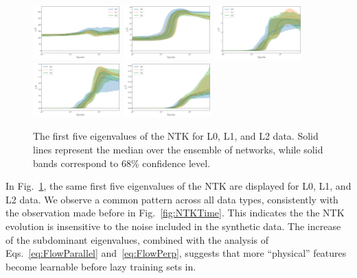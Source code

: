 \begin{figure}[t]
  \centering
  \includegraphics[width=0.30\textwidth]{figs/section_3/ntk_eigvals_L0_L1_L2_n_1.pdf}
  \includegraphics[width=0.30\textwidth]{figs/section_3/ntk_eigvals_L0_L1_L2_n_2.pdf}
  \includegraphics[width=0.30\textwidth]{figs/section_3/ntk_eigvals_L0_L1_L2_n_3.pdf}
  \includegraphics[width=0.30\textwidth]{figs/section_3/ntk_eigvals_L0_L1_L2_n_4.pdf}
  \includegraphics[width=0.30\textwidth]{figs/section_3/ntk_eigvals_L0_L1_L2_n_5.pdf}
  \caption{The first five eigenvalues of the NTK for L0, L1, and L2 data. Solid
  lines represent the median over the ensemble of networks, while solid bands
  correspond to 68\% confidence level.}
  \label{fig:EigvalsComparison}
\end{figure}

In Fig.~\ref{fig:EigvalsComparison}, the same first five eigenvalues of the NTK
are displayed for L0, L1, and L2 data. We observe a common pattern across all
data types, consistently with the observation made before in
Fig.~\ref{fig:NTKTime}. This indicates the the NTK evolution is insensitive to
the noise included in the synthetic data. The increase of the subdominant
eigenvalues, combined with the analysis of Eqs.~\eqref{eq:FlowParallel}
and~\eqref{eq:FlowPerp}, suggests that more ``physical'' features become
learnable before lazy training sets in.

